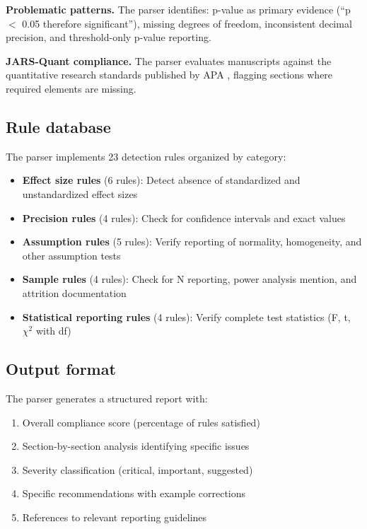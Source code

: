 \documentclass[article]{jss}
\begin{document}
\textbf{Problematic patterns.} The parser identifies: p-value as primary evidence (``p $<$ 0.05 therefore significant''), missing degrees of freedom, inconsistent decimal precision, and threshold-only p-value reporting.

\textbf{JARS-Quant compliance.} The parser evaluates manuscripts against the quantitative research standards published by APA \citep{appelbaum2018jars}, flagging sections where required elements are missing.

\subsection{Rule database}

The parser implements 23 detection rules organized by category:

\begin{itemize}
\item \textbf{Effect size rules} (6 rules): Detect absence of standardized and unstandardized effect sizes
\item \textbf{Precision rules} (4 rules): Check for confidence intervals and exact values
\item \textbf{Assumption rules} (5 rules): Verify reporting of normality, homogeneity, and other assumption tests
\item \textbf{Sample rules} (4 rules): Check for N reporting, power analysis mention, and attrition documentation
\item \textbf{Statistical reporting rules} (4 rules): Verify complete test statistics (F, t, $\chi^2$ with df)
\end{itemize}

\subsection{Output format}

The parser generates a structured report with:

\begin{enumerate}
\item Overall compliance score (percentage of rules satisfied)
\item Section-by-section analysis identifying specific issues
\item Severity classification (critical, important, suggested)
\item Specific recommendations with example corrections
\item References to relevant reporting guidelines
\end{enumerate}
\end{document}
